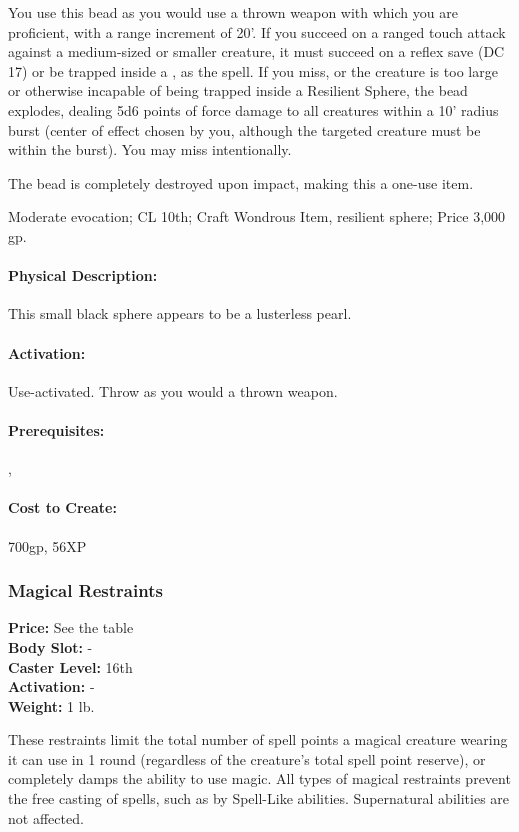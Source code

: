 You use this bead as you would use a thrown weapon with which you are proficient, with a range increment of 20'. If you succeed on a ranged touch attack against a medium-sized or smaller creature, it must succeed on a reflex save (DC 17) or be trapped inside a , as the spell.
If you miss, or the creature is too large or otherwise incapable of being trapped inside a Resilient Sphere, the bead explodes, dealing 5d6 points of force damage to all creatures within a 10' radius burst (center of effect chosen by you, although the targeted creature must be within the burst). You may miss intentionally.

The bead is completely destroyed upon impact, making this a one-use item.

Moderate evocation; CL 10th; Craft Wondrous Item, resilient sphere; Price 3,000 gp.

\paragraph{Physical Description:} This small black sphere appears to be a lusterless pearl.

\paragraph{Activation:} Use-activated. Throw as you would a thrown weapon.

\paragraph{Prerequisites:} , 

\paragraph{Cost to Create:} 700gp, 56XP
\subsubsection{Magical Restraints}
\textbf{Price:} See the  table\\
\textbf{Body Slot:} -\\
\textbf{Caster Level:} 16th\\
\textbf{Activation:} -\\
\textbf{Weight:} 1 lb.

 These restraints limit the total number of spell points a magical creature wearing it can use in 1 round (regardless of the creature's total spell point reserve), or completely damps the ability to use magic. 
All types of magical restraints prevent the free casting of spells, such as by Spell-Like abilities. Supernatural abilities are not affected.

